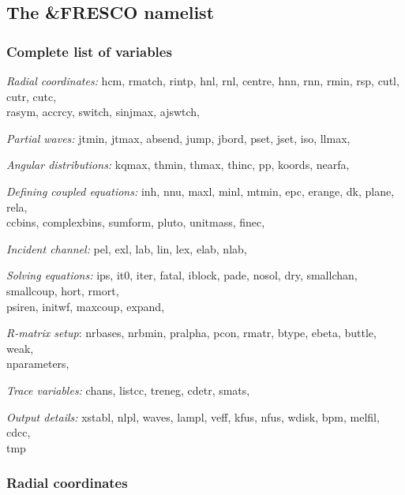 \documentclass[11pt]{article}
\begin{document}
\subsection{The \&FRESCO namelist}

\subsubsection*{Complete list of variables}

{\em Radial coordinates:}
hcm, rmatch, rintp, hnl, rnl, centre, hnn, rnn, rmin, rsp, cutl, cutr, cutc, \\
rasym, accrcy, switch, sinjmax, ajswtch, 

\noindent
{\em Partial waves:}
jtmin, jtmax, absend, jump, jbord, pset, jset,  iso, llmax, 



\noindent
{\em Angular distributions:}
kqmax,  thmin, thmax, thinc, pp, koords,  nearfa,

\noindent
{\em Defining coupled equations:}
inh, nnu, maxl, minl, mtmin, epc,  erange, dk,  plane,   rela,  \\
ccbins, complexbins, sumform,  pluto,  unitmass, finec,  


\noindent
{\em Incident channel:}
 pel, exl, lab, lin, lex, elab, nlab, 

\noindent
{\em Solving equations:}
ips, it0, iter, fatal, iblock, pade, nosol, dry, smallchan, smallcoup, hort, rmort, \\
psiren, initwf, maxcoup, expand, 


\noindent
{\em R-matrix setup}:
nrbases, nrbmin, pralpha, pcon, rmatr, btype, ebeta, buttle, weak, \\
nparameters,   

\noindent
{\em Trace variables:}
chans, listcc, treneg, cdetr, smats,    

\noindent
{\em Output details:}
xstabl, nlpl, waves, lampl, veff, kfus, nfus, wdisk, bpm, melfil, cdcc, \\
tmp


\subsubsection{Radial coordinates}
\end{document}
